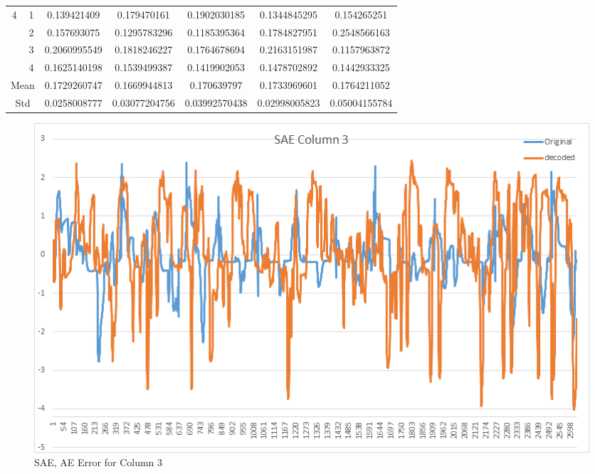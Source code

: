 \documentclass[draft,dvipsnames]{drexel-thesis}
\begin{document}
\begin{thesis}
\begin{table}[!t]
\begin{tabular}{|c|c|c|c|c|c|c|}
\multirow{4}{*}{4}    & 1                   & 0.139421409  & 0.179470161   & 0.1902030185  & 0.1344845295  & 0.154265251   \\ \cline{2-7}
                      & 2                   & 0.157693075  & 0.1295783296  & 0.1185395364  & 0.1784827951  & 0.2548566163  \\ \cline{2-7}
                      & 3                   & 0.2060995549 & 0.1818246227  & 0.1764678694  & 0.2163151987  & 0.1157963872  \\ \cline{2-7}
                      & 4                   & 0.1625140198 & 0.1539499387  & 0.1419902053  & 0.1478702892  & 0.1442933325  \\ \hline
\multicolumn{2}{|c|}{Mean}                  & 0.1729260747 & 0.1669944813  & 0.170639797   & 0.1733969601  & 0.1764211052  \\ \hline
\multicolumn{2}{|c|}{Std}                   & 0.0258008777 & 0.03077204756 & 0.03992570438 & 0.02998005823 & 0.05004155784 \\ \hline
\end{tabular}
\end{table}

\begin{figure}[t!]
    \centering
    \includegraphics[width=\textwidth]{pictures/result_pictures/SAE_Column_3.png}
    \caption{SAE, AE Error for Column 3}
    \label{fig:sae_error_c3}
\end{figure}


\end{thesis}
\end{document}
